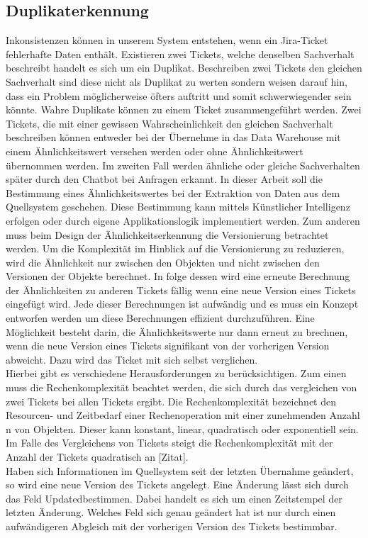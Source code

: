 \subsection{Duplikaterkennung}
Inkonsistenzen können in unserem System entstehen, wenn ein Jira-Ticket fehlerhafte Daten enthält. Existieren zwei Tickets, welche denselben Sachverhalt beschreibt handelt es sich um ein Duplikat. Beschreiben zwei Tickets den gleichen Sachverhalt sind diese nicht als Duplikat zu werten sondern weisen darauf hin, dass ein Problem möglicherweise öfters auftritt und somit schwerwiegender sein könnte. Wahre Duplikate können zu einem Ticket zusammengeführt werden. Zwei Tickets, die mit einer gewissen Wahrscheinlichkeit den gleichen Sachverhalt beschreiben können entweder bei der Übernehme in das Data Warehouse mit einem Ähnlichkeitswert versehen werden oder ohne Ähnlichkeitswert übernommen werden. Im zweiten Fall werden ähnliche oder gleiche Sachverhalten später durch den Chatbot bei Anfragen erkannt. In dieser Arbeit soll die Bestimmung eines Ähnlichkeitswertes bei der Extraktion von Daten aus dem Quellsystem geschehen. Diese Bestimmung kann mittels Künstlicher Intelligenz erfolgen oder durch eigene Applikationslogik implementiert werden. Zum anderen muss beim Design der Ähnlichkeitserkennung die Versionierung betrachtet werden. Um die Komplexität im Hinblick auf die Versionierung zu reduzieren, wird die Ähnlichkeit nur zwischen den Objekten und nicht zwischen den Versionen der Objekte berechnet. In folge dessen wird eine erneute Berechnung der Ähnlichkeiten zu anderen Tickets fällig wenn eine neue Version eines Tickets eingefügt wird. Jede dieser Berechnungen ist aufwändig und es muss ein Konzept entworfen werden um diese Berechnungen effizient durchzuführen. Eine Möglichkeit besteht darin, die Ähnlichkeitswerte nur dann erneut zu brechnen, wenn die neue Version eines Tickets signifikant von der vorherigen Version abweicht. Dazu wird das Ticket mit sich selbst verglichen.\\
Hierbei gibt es verschiedene Herausforderungen zu berücksichtigen. Zum einen muss die Rechenkomplexität beachtet werden, die sich durch das vergleichen von zwei Tickets bei allen Tickets ergibt. Die Rechenkomplexität bezeichnet den Resourcen- und Zeitbedarf einer Rechenoperation mit einer zunehmenden Anzahl n von Objekten. Dieser kann konstant, linear, quadratisch oder exponentiell sein. Im Falle des Vergleichens von Tickets steigt die Rechenkomplexität mit der Anzahl der Tickets quadratisch an [Zitat].\\
Haben sich Informationen im Quellsystem seit der letzten Übernahme geändert, so wird eine neue Version des Tickets angelegt. Eine Änderung lässt sich durch das Feld \glqq Updated\grqq\:bestimmen. Dabei handelt es sich um einen Zeitstempel der letzten Änderung. Welches Feld sich genau geändert hat ist nur durch einen aufwändigeren Abgleich mit der vorherigen Version des Tickets bestimmbar.
